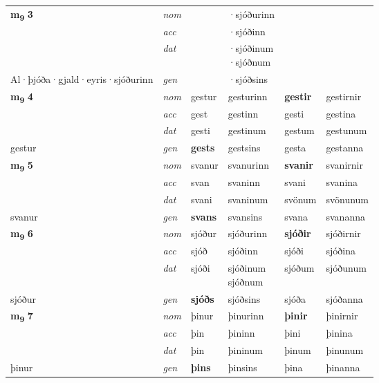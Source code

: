 \begin{longtable}[l]{X>{\footnotesize\itshape}XXXXX}
\multirow{3}{*}{{{\textbf{m{\textsubscript{9}}} \Large{\textbf{3}}}}} & nom &  & ·sjóðurinn & \textbf{} &  \\*
 & acc &  & ·sjóðinn &  &  \\*
 & dat &  & \specialcell{·sjóðinum\\  ·sjóðnum} &  &  \\*
 {\footnotesize{Al\allowbreak ·þjóða\allowbreak ·gjald\allowbreak ·eyris\allowbreak ·sjóðurinn}} & gen & \textbf{} & ·sjóðsins &  &  \\
\midrule

\multirow{3}{*}{{{\textbf{m{\textsubscript{9}}} \Large{\textbf{4}}}}} & nom & gestur & gesturinn & \textbf{gestir} & gestirnir \\*
 & acc & gest & gestinn & gesti & gestina \\*
 & dat & gesti & gestinum & gestum & gestunum \\*
 {\footnotesize{gestur}} & gen & \textbf{gests} & gestsins & gesta & gestanna \\
\midrule

\multirow{3}{*}{{{\textbf{m{\textsubscript{9}}} \Large{\textbf{5}}}}} & nom & svanur & svanurinn & \textbf{svanir} & svanirnir \\*
 & acc & svan & svaninn & svani & svanina \\*
 & dat & svani & svaninum & svönum & svönunum \\*
 {\footnotesize{svanur}} & gen & \textbf{svans} & svansins & svana & svananna \\
\midrule

\multirow{3}{*}{{{\textbf{m{\textsubscript{9}}} \Large{\textbf{6}}}}} & nom & sjóður & sjóðurinn & \textbf{sjóðir} & sjóðirnir \\*
 & acc & sjóð & sjóðinn & sjóði & sjóðina \\*
 & dat & sjóði & \specialcell{sjóðinum\\ sjóðnum} & sjóðum & sjóðunum \\*
 {\footnotesize{sjóður}} & gen & \textbf{sjóðs} & sjóðsins & sjóða & sjóðanna \\
\midrule

\multirow{3}{*}{{{\textbf{m{\textsubscript{9}}} \Large{\textbf{7}}}}} & nom & þinur & þinurinn & \textbf{þinir} & þinirnir \\*
 & acc & þin & þininn & þini & þinina \\*
 & dat & þin & þininum & þinum & þinunum \\*
 {\footnotesize{þinur}} & gen & \textbf{þins} & þinsins & þina & þinanna \\
\midrule


\end{longtable}
